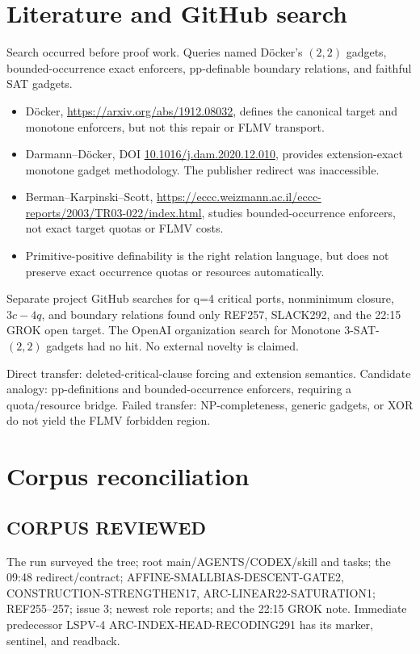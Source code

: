 \documentclass[11pt]{article}
\begin{document}
\section{Literature and GitHub search}
Search occurred before proof work.  Queries named D\"ocker's $(2,2)$ gadgets, bounded-occurrence exact enforcers, pp-definable boundary relations, and faithful SAT gadgets.
\begin{itemize}
\item D\"ocker, \url{https://arxiv.org/abs/1912.08032}, defines the canonical target and monotone enforcers, but not this repair or FLMV transport.
\item Darmann--D\"ocker, DOI \href{https://doi.org/10.1016/j.dam.2020.12.010}{10.1016/j.dam.2020.12.010}, provides extension-exact monotone gadget methodology.  The publisher redirect was inaccessible.
\item Berman--Karpinski--Scott, \url{https://eccc.weizmann.ac.il/eccc-reports/2003/TR03-022/index.html}, studies bounded-occurrence enforcers, not exact target quotas or FLMV costs.
\item Primitive-positive definability is the right relation language, but does not preserve exact occurrence quotas or resources automatically.
\end{itemize}
Separate project GitHub searches for q=4 critical ports, nonminimum closure, $3c-4q$, and boundary relations found only REF257, SLACK292, and the 22:15 GROK open target.  The OpenAI organization search for Monotone 3-SAT-$(2,2)$ gadgets had no hit.  No external novelty is claimed.

Direct transfer: deleted-critical-clause forcing and extension semantics.  Candidate analogy: pp-definitions and bounded-occurrence enforcers, requiring a quota/resource bridge.  Failed transfer: NP-completeness, generic gadgets, or XOR do not yield the FLMV forbidden region.

\section{Corpus reconciliation}
\subsection*{CORPUS REVIEWED}
The run surveyed the tree; root main/AGENTS/CODEX/skill and tasks; the 09:48 redirect/contract; AFFINE-SMALLBIAS-DESCENT-GATE2, CONSTRUCTION-STRENGTHEN17, ARC-LINEAR22-SATURATION1; REF255--257; issue 3; newest role reports; and the 22:15 GROK note.  Immediate predecessor LSPV-4 ARC-INDEX-HEAD-RECODING291 has its marker, sentinel, and readback.
\end{document}
